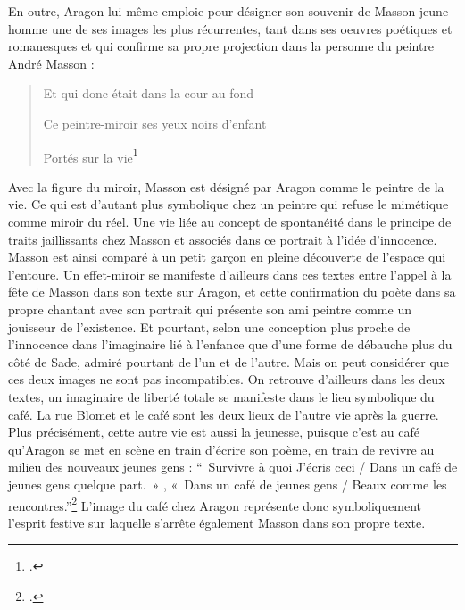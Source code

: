 	En outre, Aragon lui-même emploie pour désigner son souvenir de Masson jeune homme une de ses images les plus récurrentes, tant dans ses oeuvres poétiques et romanesques et qui confirme sa propre projection dans la personne du peintre André Masson : 

\begin{verse}
    
Et qui donc était dans la cour au fond

Ce peintre-miroir ses yeux noirs d’enfant

Portés sur la vie\footcite[p682]{ecritssurla}\end{verse}



	Avec la figure du miroir, Masson est désigné par Aragon comme le peintre de la vie. Ce qui est d’autant plus symbolique chez un peintre qui refuse le mimétique comme miroir du réel. Une vie  liée au concept de spontanéité dans le principe de traits jaillissants chez Masson et associés dans ce portrait à l’idée d’innocence. Masson est ainsi comparé à un petit garçon en pleine découverte de l’espace qui l’entoure. Un effet-miroir se manifeste d’ailleurs dans ces textes entre l’appel à la fête de Masson dans son texte sur Aragon, et cette confirmation du poète dans sa propre chantant avec son portrait qui présente son ami peintre comme un jouisseur de l’existence. Et pourtant, selon une conception plus proche de l’innocence dans l’imaginaire lié à l’enfance que d’une forme de débauche plus du côté de Sade, admiré pourtant de l’un et de l’autre. Mais on peut considérer que ces deux images ne sont pas incompatibles. On retrouve d’ailleurs dans les deux textes, un imaginaire de liberté totale se manifeste dans le lieu symbolique du café. La rue Blomet et le café sont les deux lieux de l’autre vie après la guerre. Plus précisément, cette autre vie est aussi la jeunesse, puisque c’est au café qu’Aragon se met en scène en train d’écrire son poème, en train de revivre au milieu des nouveaux jeunes gens : \enquote{ Survivre à quoi J’écris ceci / Dans un café de jeunes gens quelque part. » , « Dans un café de jeunes gens / Beaux comme les rencontres.}\footcite[p681]{ecritssurla} L’image du café chez Aragon représente donc symboliquement l’esprit festive sur laquelle s’arrête également Masson dans son propre texte. 

